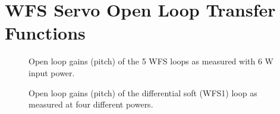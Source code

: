 \section{WFS Servo Open Loop Transfer Functions}



\begin{figure}
\begin{centering}
\caption{Open loop gains (pitch) of the 5 WFS loops as measured with 6 W
  input power.}
\label{fig:olgs6W}
\end{centering}
\end{figure}


\begin{figure}
\begin{centering}
\caption{Open loop gains (pitch) of the differential soft (WFS1) loop as measured at four
  different powers.}
\label{fig:DSolgs}
\end{centering}
\end{figure}

